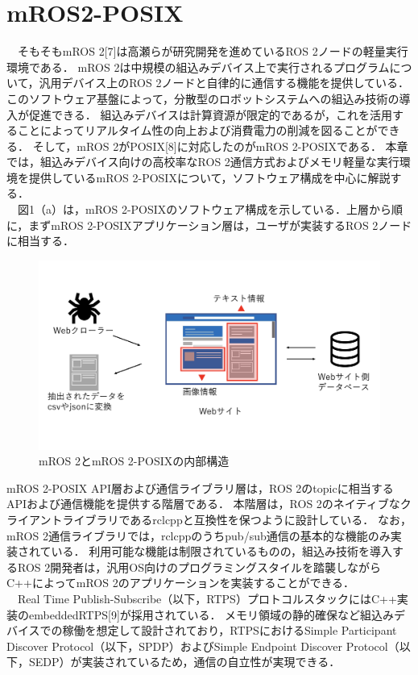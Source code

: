 \documentclass[11pt]{ujarticle}
\begin{document}
\section{mROS2-POSIX}
　そもそもmROS 2[7]は高瀬らが研究開発を進めているROS 2ノードの軽量実行環境である．
mROS 2は中規模の組込みデバイス上で実行されるプログラムについて，汎用デバイス上のROS 2ノードと自律的に通信する機能を提供している．
このソフトウェア基盤によって，分散型のロボットシステムへの組込み技術の導入が促進できる．
組込みデバイスは計算資源が限定的であるが，これを活用することによってリアルタイム性の向上および消費電力の削減を図ることができる．
そして，mROS 2がPOSIX[8]に対応したのがmROS 2-POSIXである．
本章では，組込みデバイス向けの高校率なROS 2通信方式およびメモリ軽量な実行環境を提供しているmROS 2-POSIXについて，ソフトウェア構成を中心に解説する．
\\　図1（a）は，mROS 2-POSIXのソフトウェア構成を示している．上層から順に，まずmROS 2-POSIXアプリケーション層は，ユーザが実装するROS 2ノードに相当する．
\begin{figure}[h]
	\includegraphics[width=0.9\linewidth]{./src/selenium.png}
	\caption{mROS 2とmROS 2-POSIXの内部構造}
  \label{fig:arch}
\end{figure}
mROS 2-POSIX API層および通信ライブラリ層は，ROS 2のtopicに相当するAPIおよび通信機能を提供する階層である．
本階層は，ROS 2のネイティブなクライアントライブラリであるrclcppと互換性を保つように設計している．
なお，mROS 2通信ライブラリでは，rclcppのうちpub/sub通信の基本的な機能のみ実装されている．
利用可能な機能は制限されているものの，組込み技術を導入するROS 2開発者は，汎用OS向けのプログラミングスタイルを踏襲しながらC++によってmROS 2のアプリケーションを実装することができる．
\\　Real Time Publish-Subscribe（以下，RTPS）プロトコルスタックにはC++実装のembeddedRTPS[9]が採用されている．
メモリ領域の静的確保など組込みデバイスでの稼働を想定して設計されており，RTPSにおけるSimple Participant Discover Protocol（以下，SPDP）およびSimple Endpoint Discover Protocol（以下，SEDP）が実装されているため，通信の自立性が実現できる．
\end{document}
